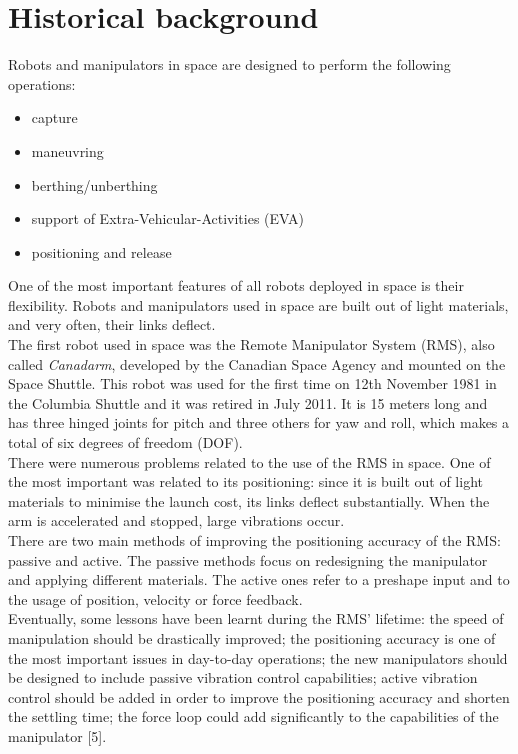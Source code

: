 \documentclass[a4paper,12pt,oneside]{report}
\begin{document}
\section{Historical background}
Robots and manipulators in space are designed to perform the following operations:
\begin{itemize}
\item capture
\item maneuvring
\item berthing/unberthing
\item support of Extra-Vehicular-Activities (EVA)
\item positioning and release
\end{itemize}
One of the most important features of all robots deployed in space is their flexibility. Robots and manipulators used in space are built out of light materials, and very often, their links deflect.\\
The first robot used in space was the Remote Manipulator System (RMS), also called \textit{Canadarm}, developed by the Canadian Space Agency and mounted on the Space Shuttle. This robot was used for the first time on 12th November 1981 in the Columbia Shuttle and it was retired in July 2011. It is 15 meters long and has three hinged joints for pitch and three others for yaw and roll, which makes a total of six degrees of freedom (DOF).\\
There were numerous problems related to the use of the RMS in space. One of the most important was related to its positioning: since it is built out of light materials to minimise the launch cost, its links deflect substantially. When the arm is accelerated and stopped, large vibrations occur.\\
There are two main methods of improving the positioning accuracy of the RMS: passive and active. The passive methods focus on redesigning the manipulator and applying different materials. The active ones refer to a preshape input and to the usage of position, velocity or force feedback.\\
Eventually, some lessons have been learnt during the RMS' lifetime: the speed of manipulation should be drastically improved; the positioning accuracy is one of the most important issues in day-to-day operations; the new manipulators should be designed to include passive vibration control capabilities; active vibration control should be added in order to improve the positioning accuracy and shorten the settling time; the force loop could add significantly to the capabilities of the manipulator [5].\\
\end{document}

